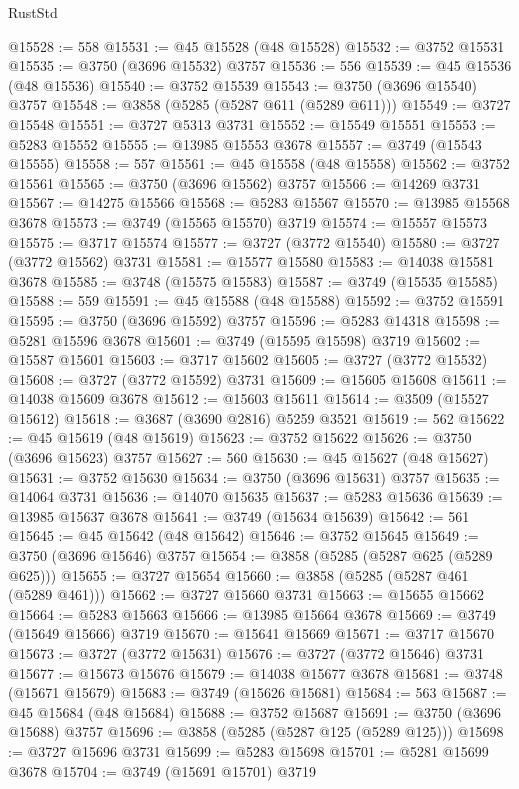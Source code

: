 \begin{lexlean}{RustStd}
\begin{coremodule}
@15528 := 558
@15531 := @45 @15528 (@48 @15528)
@15532 := @3752 @15531
@15535 := @3750 (@3696 @15532) @3757
@15536 := 556
@15539 := @45 @15536 (@48 @15536)
@15540 := @3752 @15539
@15543 := @3750 (@3696 @15540) @3757
@15548 := @3858 (@5285 (@5287 @611 (@5289 @611)))
@15549 := @3727 @15548
@15551 := @3727 @5313 @3731
@15552 := @15549 @15551
@15553 := @5283 @15552
@15555 := @13985 @15553 @3678
@15557 := @3749 (@15543 @15555)
@15558 := 557
@15561 := @45 @15558 (@48 @15558)
@15562 := @3752 @15561
@15565 := @3750 (@3696 @15562) @3757
@15566 := @14269 @3731
@15567 := @14275 @15566
@15568 := @5283 @15567
@15570 := @13985 @15568 @3678
@15573 := @3749 (@15565 @15570) @3719
@15574 := @15557 @15573
@15575 := @3717 @15574
@15577 := @3727 (@3772 @15540)
@15580 := @3727 (@3772 @15562) @3731
@15581 := @15577 @15580
@15583 := @14038 @15581 @3678
@15585 := @3748 (@15575 @15583)
@15587 := @3749 (@15535 @15585)
@15588 := 559
@15591 := @45 @15588 (@48 @15588)
@15592 := @3752 @15591
@15595 := @3750 (@3696 @15592) @3757
@15596 := @5283 @14318
@15598 := @5281 @15596 @3678
@15601 := @3749 (@15595 @15598) @3719
@15602 := @15587 @15601
@15603 := @3717 @15602
@15605 := @3727 (@3772 @15532)
@15608 := @3727 (@3772 @15592) @3731
@15609 := @15605 @15608
@15611 := @14038 @15609 @3678
@15612 := @15603 @15611
@15614 := @3509 (@15527 @15612)
@15618 := @3687 (@3690 @2816) @5259 @3521
@15619 := 562
@15622 := @45 @15619 (@48 @15619)
@15623 := @3752 @15622
@15626 := @3750 (@3696 @15623) @3757
@15627 := 560
@15630 := @45 @15627 (@48 @15627)
@15631 := @3752 @15630
@15634 := @3750 (@3696 @15631) @3757
@15635 := @14064 @3731
@15636 := @14070 @15635
@15637 := @5283 @15636
@15639 := @13985 @15637 @3678
@15641 := @3749 (@15634 @15639)
@15642 := 561
@15645 := @45 @15642 (@48 @15642)
@15646 := @3752 @15645
@15649 := @3750 (@3696 @15646) @3757
@15654 := @3858 (@5285 (@5287 @625 (@5289 @625)))
@15655 := @3727 @15654
@15660 := @3858 (@5285 (@5287 @461 (@5289 @461)))
@15662 := @3727 @15660 @3731
@15663 := @15655 @15662
@15664 := @5283 @15663
@15666 := @13985 @15664 @3678
@15669 := @3749 (@15649 @15666) @3719
@15670 := @15641 @15669
@15671 := @3717 @15670
@15673 := @3727 (@3772 @15631)
@15676 := @3727 (@3772 @15646) @3731
@15677 := @15673 @15676
@15679 := @14038 @15677 @3678
@15681 := @3748 (@15671 @15679)
@15683 := @3749 (@15626 @15681)
@15684 := 563
@15687 := @45 @15684 (@48 @15684)
@15688 := @3752 @15687
@15691 := @3750 (@3696 @15688) @3757
@15696 := @3858 (@5285 (@5287 @125 (@5289 @125)))
@15698 := @3727 @15696 @3731
@15699 := @5283 @15698
@15701 := @5281 @15699 @3678
@15704 := @3749 (@15691 @15701) @3719

\end{coremodule}
\end{lexlean}
